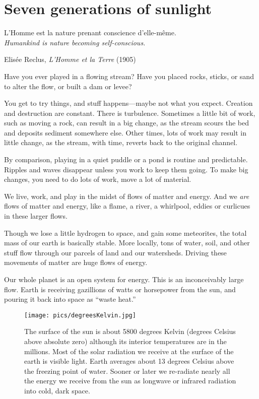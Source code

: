 \documentclass[11pt,letterpaper,twoside,onecolumn]{memoir}
\begin{document}
\chapter{Seven generations of sunlight}


\epigraph{L'Homme est la nature prenant conscience d'elle-m\^{e}me.\\\textit{Humankind is nature becoming self-conscious.}}{Elis\'{e}e Reclus, \textit{L'Homme et la Terre} (1905)}


\noindent Have you ever played in a flowing stream? Have you placed rocks, sticks, or sand to alter the flow, or built a dam or levee?

You get to try things, and stuff happens---maybe not what you expect. Creation and destruction are constant. There is turbulence. Sometimes a little bit of work, such as moving a rock, can result in a big change, as the stream scours the bed and deposits sediment somewhere else. Other times, lots of work may result in little change, as the stream, with time, reverts back to the original channel.

By comparison, playing in a quiet puddle or a pond is routine and predictable. Ripples and waves disappear unless you work to keep them going. To make big changes, you need to do lots of work, move a lot of material. 

We live, work, and play in the midst of flows of matter and energy. And we \textit{are} flows of matter and energy, like a flame, a river, a whirlpool, eddies or curlicues in these larger flows. 

Though we lose a little hydrogen to space, and gain some meteorites, the total mass of our earth is basically stable. More locally, tons of water, soil, and other stuff flow through our parcels of land and our watersheds. Driving these movements of matter are huge flows of energy.

Our whole planet is an open system for energy. This is an inconceivably large flow. Earth is receiving gazillions of watts or horsepower from the sun, and pouring it back into space as ``waste heat.''

\begin{figure}
\texttt{[image: pics/degreesKelvin.jpg]}
\caption*{The surface of the sun is about 5800 degrees Kelvin (degrees Celsius above absolute zero) although its interior temperatures are in the millions. Most of the solar radiation we receive at the surface of the earth is visible light. Earth averages about 13 degrees Celsius above the freezing point of water. Sooner or later we re-radiate nearly all the energy we receive from the sun as longwave or infrared radiation into cold, dark space.}
\end{figure}
\end{document}
